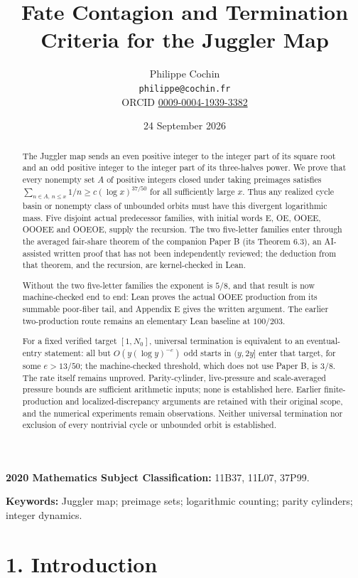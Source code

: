 \documentclass[11pt,a4paper]{article}
\title{Fate Contagion and Termination Criteria for the Juggler Map}
\author{Philippe Cochin \\ \texttt{philippe@cochin.fr} \\
  \small ORCID \href{https://orcid.org/0009-0004-1939-3382}{0009-0004-1939-3382}}
\date{24 September 2026}
\begin{document}
\maketitle
\begin{abstract}

The Juggler map sends an even positive integer to the integer part of
its square root and an odd positive integer to the integer part of its
three-halves power. We prove that every nonempty set \(A\) of positive
integers closed under taking preimages satisfies
\(\sum_{n\in A,\,n\le x}1/n\ge c(\log x)^{37/50}\) for all sufficiently
large \(x\). Thus any realized cycle basin or nonempty class of
unbounded orbits must have this divergent logarithmic mass. Five
disjoint actual predecessor families, with initial words E, OE, OOEE,
OOOEE and OOEOE, supply the recursion. The two five-letter families
enter through the averaged fair-share theorem of the companion Paper B
(its Theorem 6.3), an AI-assisted written proof that has not been
independently reviewed; the deduction from that theorem, and the
recursion, are kernel-checked in Lean.

Without the two five-letter families the exponent is \(5/8\), and that
result is now machine-checked end to end: Lean proves the actual OOEE
production from its summable poor-fiber tail, and Appendix E gives the
written argument. The earlier two-production route remains an elementary
Lean baseline at \(100/203\).

For a fixed verified target \([1,N_0]\), universal termination is
equivalent to an eventual-entry statement: all but \(O(y(\log y)^{-e})\)
odd starts in \((y,2y]\) enter that target, for some \(e>13/50\); the
machine-checked threshold, which does not use Paper B, is \(3/8\). The
rate itself remains unproved. Parity-cylinder, live-pressure and
scale-averaged pressure bounds are sufficient arithmetic inputs; none is
established here. Earlier finite-production and localized-discrepancy
arguments are retained with their original scope, and the numerical
experiments remain observations. Neither universal termination nor
exclusion of every nontrivial cycle or unbounded orbit is established.

\end{abstract}

\textbf{2020 Mathematics Subject Classification:} 11B37, 11L07, 37P99.

\textbf{Keywords:} Juggler map; preimage sets; logarithmic counting;
parity cylinders; integer dynamics.

\section{1. Introduction}\label{introduction}
\end{document}
